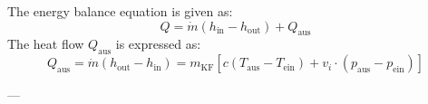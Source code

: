 The energy balance equation is given as:  
\[
Q = \dot{m} \left( h_{\text{in}} - h_{\text{out}} \right) + Q_{\text{aus}}
\]  
The heat flow \( Q_{\text{aus}} \) is expressed as:  
\[
Q_{\text{aus}} = \dot{m} \left( h_{\text{out}} - h_{\text{in}} \right) = m_{\text{KF}} \left[ c \left( T_{\text{aus}} - T_{\text{ein}} \right) + v_i \cdot \left( p_{\text{aus}} - p_{\text{ein}} \right) \right]
\]  

---